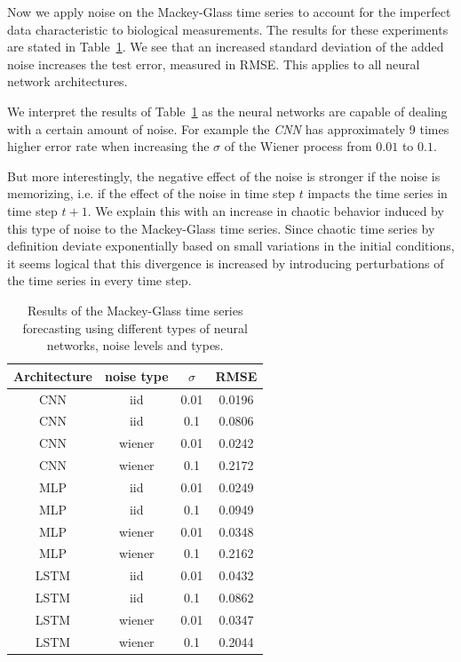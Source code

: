 \documentclass{article}
\begin{document}
Now we apply noise on the Mackey-Glass time series to account for the imperfect
data characteristic to biological measurements. The results for these
experiments are stated in Table~\ref{tab:mackey_noise}. We see that an increased
standard deviation of the added noise increases the test error, measured in
RMSE. This applies to all neural network architectures.

We interpret the results of Table~\ref{tab:mackey_noise}
as the neural networks are capable of dealing with a certain
amount of noise. For example the \emph{CNN} has
approximately 9 times higher error rate when increasing the $\sigma$ of the
Wiener process from $0.01$ to $0.1$.

But more interestingly,
the negative effect of the noise is stronger if the noise is memorizing, i.e. if
the effect of the noise in time step $t$ impacts the time series in time step
$t + 1$. We explain this with an increase in chaotic behavior induced by this
type of noise to the Mackey-Glass time series. Since chaotic time series by
definition deviate exponentially based on small variations in the initial
conditions, it seems logical that this divergence is increased by introducing
perturbations of the time series in every time step.

\begin{table}
    \centering
    \begin{tabular}{c|c|c|c}
        Architecture & noise type & $\sigma$ & RMSE   \\
        \hline
        CNN          & iid        & 0.01     & 0.0196 \\
        CNN          & iid        & 0.1      & 0.0806 \\
        CNN          & wiener     & 0.01     & 0.0242 \\
        CNN          & wiener     & 0.1      & 0.2172 \\
        MLP          & iid        & 0.01     & 0.0249 \\
        MLP          & iid        & 0.1      & 0.0949 \\
        MLP          & wiener     & 0.01     & 0.0348 \\
        MLP          & wiener     & 0.1      & 0.2162 \\
        LSTM         & iid        & 0.01     & 0.0432 \\
        LSTM         & iid        & 0.1      & 0.0862 \\
        LSTM         & wiener     & 0.01     & 0.0347 \\
        LSTM         & wiener     & 0.1      & 0.2044 \\
    \end{tabular}
    \caption{Results of the Mackey-Glass time series forecasting using different
        types of neural networks, noise levels and types.}
    \label{tab:mackey_noise}
\end{table}
\end{document}
